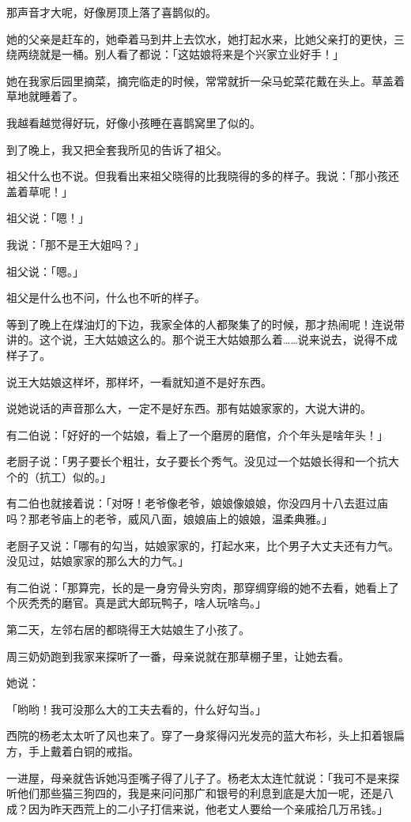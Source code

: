 \documentclass[UTF8]{ctexart}
\begin{document}
那声音才大呢，好像房顶上落了喜鹊似的。

她的父亲是赶车的，她牵着马到井上去饮水，她打起水来，比她父亲打的更快，三绕两绕就是一桶。别人看了都说：「这姑娘将来是个兴家立业好手！」

她在我家后园里摘菜，摘完临走的时候，常常就折一朵马蛇菜花戴在头上。草盖着草地就睡着了。

我越看越觉得好玩，好像小孩睡在喜鹊窝里了似的。

到了晚上，我又把全套我所见的告诉了祖父。

祖父什么也不说。但我看出来祖父晓得的比我晓得的多的样子。我说：「那小孩还盖着草呢！」

祖父说：「嗯！」

我说：「那不是王大姐吗？」

祖父说：「嗯。」

祖父是什么也不问，什么也不听的样子。

等到了晚上在煤油灯的下边，我家全体的人都聚集了的时候，那才热闹呢！连说带讲的。这个说，王大姑娘这么的。那个说王大姑娘那么着……说来说去，说得不成样子了。

说王大姑娘这样坏，那样坏，一看就知道不是好东西。

说她说话的声音那么大，一定不是好东西。那有姑娘家家的，大说大讲的。

有二伯说：「好好的一个姑娘，看上了一个磨房的磨倌，介个年头是啥年头！」

老厨子说：「男子要长个粗壮，女子要长个秀气。没见过一个姑娘长得和一个抗大个的（抗工）似的。」

有二伯也就接着说：「对呀！老爷像老爷，娘娘像娘娘，你没四月十八去逛过庙吗？那老爷庙上的老爷，威风八面，娘娘庙上的娘娘，温柔典雅。」

老厨子又说：「哪有的勾当，姑娘家家的，打起水来，比个男子大丈夫还有力气。没见过，姑娘家家的那么大的力气。」

有二伯说：「那算完，长的是一身穷骨头穷肉，那穿绸穿缎的她不去看，她看上了个灰秃秃的磨官。真是武大郎玩鸭子，啥人玩啥鸟。」

第二天，左邻右居的都晓得王大姑娘生了小孩了。

周三奶奶跑到我家来探听了一番，母亲说就在那草棚子里，让她去看。

她说：

「哟哟！我可没那么大的工夫去看的，什么好勾当。」

西院的杨老太太听了风也来了。穿了一身浆得闪光发亮的蓝大布衫，头上扣着银扁方，手上戴着白铜的戒指。

一进屋，母亲就告诉她冯歪嘴子得了儿子了。杨老太太连忙就说：「我可不是来探听他们那些猫三狗四的，我是来问问那广和银号的利息到底是大加一呢，还是八成？因为昨天西荒上的二小子打信来说，他老丈人要给一个亲戚拾几万吊钱。」
\end{document}
